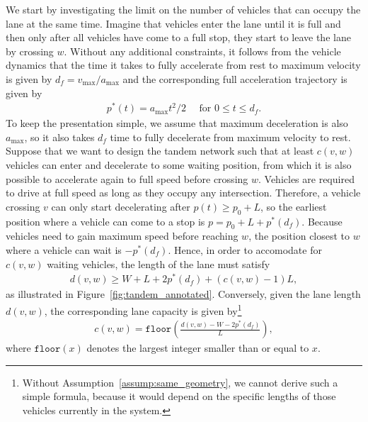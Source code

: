 \documentclass[a4paper]{article}
\theoremstyle{definition}
\theoremstyle{plain}
\begin{document}
We start by investigating the limit on the number of vehicles that can occupy
the lane at the same time. Imagine that vehicles enter the lane until it is full
and then only after all vehicles have come to a full stop, they start to leave
the lane by crossing $w$.
%
Without any additional constraints, it follows from the vehicle dynamics that
the time it takes to fully accelerate from rest to maximum velocity is given by
$d_{f} = v_{\max} / a_{\max}$ and the corresponding full acceleration trajectory
is given by
\begin{align*}
  p^{*}(t) = a_{\max} t^{2} / 2 \quad \text{ for } 0 \leq t \leq d_{f} .
\end{align*}
To keep the presentation simple, we assume that maximum deceleration is also
$a_{\max}$, so it also takes $d_{f}$ time to fully decelerate from maximum
velocity to rest.
%
Suppose that we want to design the tandem network such that at least $c(v,w)$
vehicles can enter and decelerate to some waiting position, from which it is
also possible to accelerate again to full speed before crossing $w$.
%
Vehicles are required to drive at full speed as long as they occupy
any intersection. Therefore, a vehicle crossing $v$ can only start decelerating
after $p(t) \geq p_{0} + L$, so the earliest position where a vehicle can come to a
stop is $p = p_{0} + L + p^{*}(d_{f})$.
%
Because vehicles need to gain maximum speed before reaching $w$,
the position closest to $w$ where a vehicle can wait is $- p^{*}(d_{f})$.
%
Hence, in order to accomodate for $c(v,w)$ waiting vehicles, the length of the
lane must satisfy
\begin{align*}
  d(v, w) \geq W + L + 2p^{*}(d_{f}) + (c(v,w) - 1) L ,
\end{align*}
as illustrated in Figure~\ref{fig:tandem_annotated}.
%
Conversely, given the lane length $d(v,w)$, the corresponding lane capacity is
given by\footnote{Without Assumption~\ref{assump:same_geometry}, we cannot
  derive such a simple formula, because it would depend on the specific lengths
  of those vehicles currently in the system.}
\begin{align*}
  c(v, w) = \texttt{floor}\left( \frac{d(v,w) - W - 2 p^{*}(d_{f})}{L} \right) ,
\end{align*}
where $\texttt{floor}(x)$ denotes the largest integer smaller than or equal to
$x$.
\end{document}
